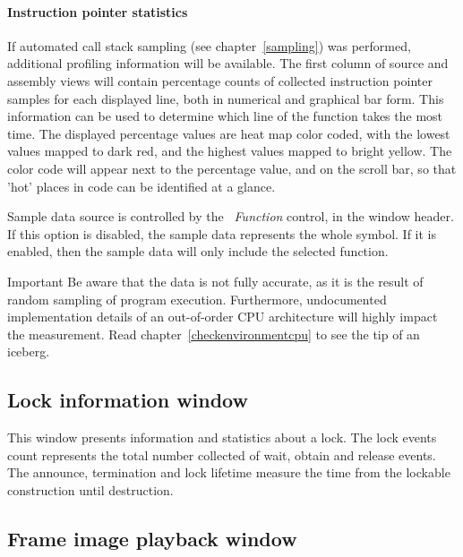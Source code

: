 \documentclass[hidelinks,titlepage,a4paper]{article}
\begin{document}
\paragraph{Instruction pointer statistics}

If automated call stack sampling (see chapter~\ref{sampling}) was performed, additional profiling information will be available. The first column of source and assembly views will contain percentage counts of collected instruction pointer samples for each displayed line, both in numerical and graphical bar form. This information can be used to determine which line of the function takes the most time. The displayed percentage values are heat map color coded, with the lowest values mapped to dark red, and the highest values mapped to bright yellow. The color code will appear next to the percentage value, and on the scroll bar, so that 'hot' places in code can be identified at a glance.

Sample data source is controlled by the \emph{\faSitemap{}~Function} control, in the window header. If this option is disabled, the sample data represents the whole symbol. If it is enabled, then the sample data will only include the selected function.


\begin{bclogo}[
noborder=true,
couleur=black!5,
logo=\bcbombe
]{Important}
Be aware that the data is not fully accurate, as it is the result of random sampling of program execution. Furthermore, undocumented implementation details of an out-of-order CPU architecture will highly impact the measurement. Read chapter~\ref{checkenvironmentcpu} to see the tip of an iceberg.
\end{bclogo}

\subsection{Lock information window}
\label{lockwindow}

This window presents information and statistics about a lock. The lock events count represents the total number collected of wait, obtain and release events. The announce, termination and lock lifetime measure the time from the lockable construction until destruction.

\subsection{Frame image playback window}
\label{playback}
\end{document}

